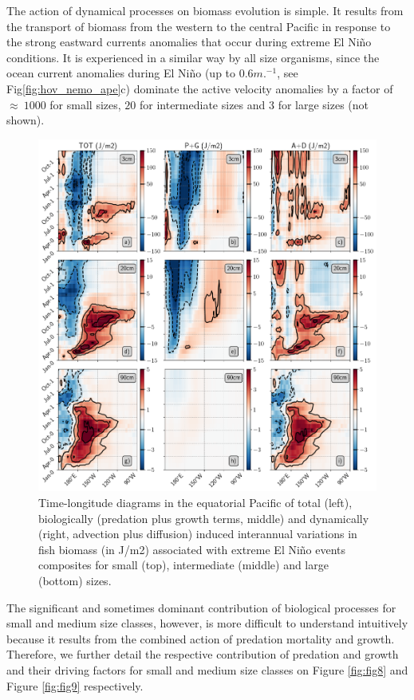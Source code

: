 The action of dynamical processes on biomass evolution is simple. It results from the transport of biomass from the western to the central Pacific in response to the strong eastward currents anomalies that occur during extreme El Niño conditions. It is experienced in a similar way by all size organisms, since the ocean current anomalies during El Niño (up to $0.6 m.^{-1}$, see Fig\ref{fig:hov_nemo_ape}c) dominate the active velocity anomalies by a factor of $\approx\ 1000$ for small sizes, $20$ for intermediate sizes and $3$ for large sizes (not shown). 

\begin{figure}[h!tp]
	\centering
	\includegraphics[scale=0.4]{figs/fig7.png}	
	\caption{Time-longitude diagrams in the equatorial Pacific of total (left), biologically (predation plus growth terms, middle) and dynamically (right, advection plus diffusion) induced interannual variations in fish biomass (in J/m2) associated with extreme El Niño events composites for small (top), intermediate (middle) and large (bottom) sizes.}
	\label{fig:fig7}
\end{figure}

The significant and sometimes dominant contribution of biological processes for small and medium size classes, however, is more difficult to understand intuitively because it results from the combined action of predation mortality and growth. Therefore, we further detail the respective contribution of predation and growth and their driving factors for small and medium size classes on Figure \ref{fig:fig8} and Figure \ref{fig:fig9} respectively.

